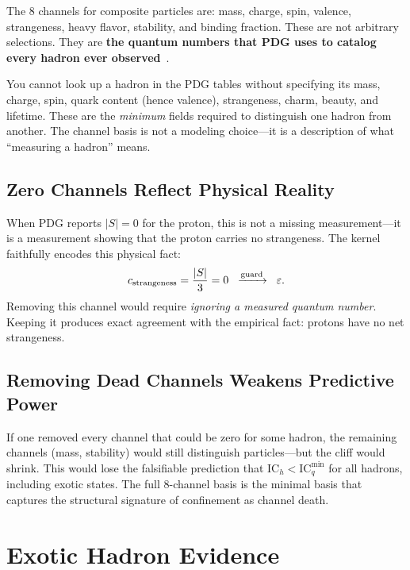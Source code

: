\documentclass[11pt,a4paper]{article}
\theoremstyle{plain}
\theoremstyle{definition}
\theoremstyle{remark}
\newcommand{\eps}{\varepsilon}
\newcommand{\beq}{\begin{equation}}
\newcommand{\eeq}{\end{equation}}
\newcommand{\IC}{\mathrm{IC}}
\begin{document}
The 8 channels for composite particles are:
mass, charge, spin, valence, strangeness, heavy flavor,
stability, and binding fraction.  These are not arbitrary
selections.  They are \textbf{the quantum numbers that PDG uses
to catalog every hadron ever observed}~\cite{pdg2024}.

\begin{warningbox}[title=The Cataloging Constraint]
\small
You cannot look up a hadron in the PDG tables without specifying
its mass, charge, spin, quark content (hence valence), strangeness,
charm, beauty, and lifetime.  These are the \emph{minimum} fields
required to distinguish one hadron from another.  The channel basis
is not a modeling choice---it is a description of what ``measuring
a hadron'' means.
\end{warningbox}

\subsection{Zero Channels Reflect Physical Reality}

When PDG reports $|S| = 0$ for the proton, this is not a
missing measurement---it is a measurement showing that the
proton carries no strangeness.  The kernel faithfully encodes
this physical fact:
\beq
  c_{\rm strangeness} = \frac{|S|}{3} = 0
  \;\;\xrightarrow{\text{guard}}\;\; \eps.
\eeq
Removing this channel would require \emph{ignoring a measured
quantum number}.  Keeping it produces exact agreement with the
empirical fact: protons have no net strangeness.

\subsection{Removing Dead Channels Weakens Predictive Power}

If one removed every channel that could be zero for some hadron,
the remaining channels (mass, stability) would still distinguish
particles---but the cliff would shrink.  This would lose the
falsifiable prediction that $\IC_h < \IC_q^{\min}$ for all
hadrons, including exotic states.  The full 8-channel basis is
the minimal basis that captures the structural signature of
confinement as channel death.


\section{Exotic Hadron Evidence}\label{sec:exotics}
\end{document}
